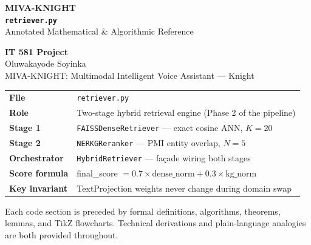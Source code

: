 \documentclass[12pt,a4paper]{article}
\theoremstyle{definition}
\theoremstyle{remark}
\begin{document}
\begin{titlepage}
\centering\vspace*{1.5cm}
{\Huge\bfseries\color{cDark} MIVA-KNIGHT}\\[0.4cm]
{\Large\bfseries \texttt{retriever.py}}\\[0.3cm]
{\large Annotated Mathematical \& Algorithmic Reference}\\[1.0cm]


\vspace{1cm}
{\large\bfseries IT 581 Project}\\[0.3cm]
{\large Oluwakayode Soyinka}\\[0.3cm]
{\normalsize MIVA-KNIGHT: Multimodal Intelligent Voice Assistant --- Knight}\\[0.8cm]

\begin{tabular}{ll}
\toprule
\textbf{File}           & \texttt{retriever.py} \\
\textbf{Role}           & Two-stage hybrid retrieval engine (Phase 2 of the pipeline) \\
\textbf{Stage 1}        & \texttt{FAISSDenseRetriever} --- exact cosine ANN, $K=20$ \\
\textbf{Stage 2}        & \texttt{NERKGReranker} --- PMI entity overlap, $N=5$ \\
\textbf{Orchestrator}   & \texttt{HybridRetriever} --- façade wiring both stages \\
\textbf{Score formula}  & final\_score $= 0.7 \times \text{dense\_norm} + 0.3 \times \text{kg\_norm}$ \\
\textbf{Key invariant}  & TextProjection weights never change during domain swap \\
\bottomrule
\end{tabular}

\vfill
{\small\color{gray}
Each code section is preceded by formal definitions, algorithms, theorems,
lemmas, and TikZ flowcharts. Technical derivations and plain-language
analogies are both provided throughout.}
\end{titlepage}
\end{document}
